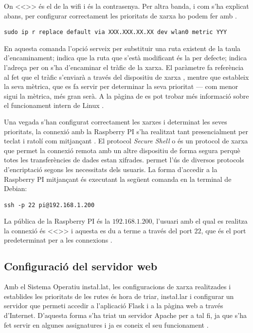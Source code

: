 \documentclass{tfgitic}[2022/06/30]
\begin{document}
On <<>> és el  de la wifi i  és la contrasenya. Per altra banda, i com s'ha explicat abans, per configurar correctament les prioritats de xarxa ho podem fer amb .

\begin{lstlisting}[style = bash]
sudo ip r replace default via XXX.XXX.XX.XX dev wlan0 metric YYY
\end{lstlisting}

En aquesta comanda l'opció  serveix per substituir una ruta existent de la taula d'encaminament;  indica que la ruta que s'està modificant és la per defecte;  indica l'adreça per on s'ha d'encaminar el tràfic de la xarxa. El paràmetre  fa referència al fet que el tràfic s'enviarà a través del dispositiu de xarxa , mentre que  estableix la seva mètrica, que es fa servir per determinar la seva prioritat --- com menor sigui la mètrica, més gran serà. A la pàgina de  es pot trobar més informació sobre el funcionament intern de Linux \cite{linux:die}.

Una vegada s'han configurat correctament les xarxes i determinat les seves prioritats, la connexió amb la Raspberry PI s'ha realitzat tant presencialment per teclat i ratolí com mitjançant . El protocol \emph{Secure Shell} o  és un protocol de xarxa que permet la connexió remota amb un altre dispositiu de forma segura perquè totes les transferències de dades estan xifrades.  permet l'ús de diversos protocols d'encriptació segons les necessitats dels usuaris. La forma d'accedir a la Raspberry PI mitjançant  és executant la següent comanda en la terminal de Debian:

\begin{lstlisting}[style = bash]
ssh -p 22 pi@192.168.1.200
\end{lstlisting}

La  pública de la Raspberry PI és la $192.168.1.200$, l'usuari amb el qual es realitza la connexió és <<>> i aquesta es du a terme a través del port $22$, que és el port predeterminat per a les connexions .

\subsection{Configuració del servidor web}
\label{subsection: serverconfig}
Amb el Sistema Operatiu insta\l.lat, les configuracions de xarxa realitzades i establides les prioritats de les rutes és hora de triar, insta\l.lar i configurar un servidor que permeti accedir a l'aplicació Flask i a la pàgina web a través d'Internet. D'aquesta forma s'ha triat un servidor Apache per a tal fi, ja que s'ha fet servir en algunes assignatures i ja es coneix el seu funcionament \cite{apache2}.
\end{document}
